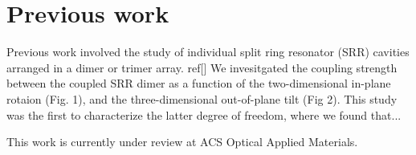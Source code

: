 \documentclass[12pt]{article}
\begin{document}
\section{Previous work}
Previous work involved the study of individual split ring resonator (SRR) 
cavities arranged in a dimer or trimer array. ref[]  We invesitgated the 
coupling strength between the coupled SRR dimer as a function of the
two-dimensional in-plane rotaion (Fig. 1), and the three-dimensional 
out-of-plane tilt (Fig 2). This study was the first to characterize the latter 
degree of freedom, where we found that...

This work is currently under review at ACS Optical Applied Materials.

\newpage


\end{document}
